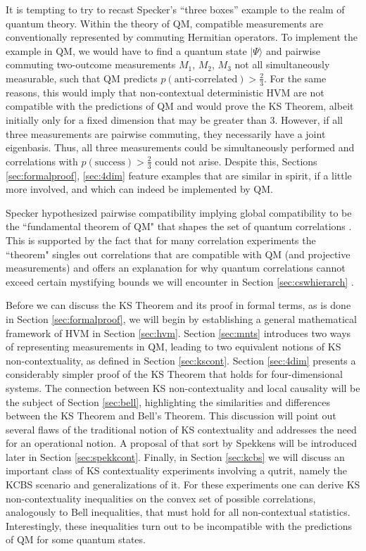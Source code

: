 It is tempting to try to recast Specker's “three boxes” example to the realm of quantum theory. Within the theory of QM, compatible measurements are conventionally represented by commuting Hermitian operators. To implement the example in QM, we would have to find a quantum state $|\Psi\rangle$ and pairwise commuting two-outcome measurements $M_{1}$, $M_{2}$, $M_{3}$ not all simultaneously measurable, such that QM predicts $p(\text{anti-correlated})>\frac{2}{3}$. For the same reasons, this would imply that non-contextual deterministic HVM are not compatible with the predictions of QM and would prove the KS Theorem, albeit initially only for a fixed dimension that may be greater than 3. However, if all three measurements are pairwise commuting, they necessarily have a joint eigenbasis. Thus, all three measurements could be simultaneously performed and correlations with $p(\text{success})>\frac{2}{3}$ could not arise. Despite this, Sections \ref{sec:formalproof}, \ref{sec:4dim} feature examples that are similar in spirit, if a little more involved, and which can indeed be implemented by QM.

Specker hypothesized pairwise compatibility implying global compatibility to be the ``fundamental theorem of QM" that shapes the set of quantum correlations \cite{Cabello2012}. This is supported by the fact that for many correlation experiments the ``theorem" singles out correlations that are compatible with QM (and projective measurements) and offers an explanation for why quantum correlations cannot exceed certain mystifying bounds we will encounter in Section \ref{sec:cswhierarch} \cite{Cabello2013}.

Before we can discuss the KS Theorem and its proof in formal terms, as is done in Section \ref{sec:formalproof}, we will begin by establishing a general mathematical framework of HVM in Section \ref{sec:hvm}. Section \ref{sec:mnts} introduces two ways of representing measurements in QM, leading to two equivalent notions of KS non-contextuality, as defined in Section \ref{sec:kscont}. Section \ref{sec:4dim} presents a considerably simpler proof of the KS Theorem that holds for four-dimensional systems. The connection between KS non-contextuality and local causality will be the subject of Section \ref{sec:bell}, highlighting the similarities and differences between the KS Theorem and Bell's Theorem. This discussion will point out several flaws of the traditional notion of KS contextuality and addresses the need for an operational notion. A proposal of that sort by Spekkens will be introduced later in Section \ref{sec:spekkcont}. Finally, in Section \ref{sec:kcbs} we will discuss an important class of KS contextuality experiments involving a qutrit, namely the KCBS scenario and generalizations of it. For these experiments one can derive KS non-contextuality inequalities on the convex set of possible correlations, analogously to Bell inequalities, that must hold for all non-contextual statistics. Interestingly, these inequalities turn out to be incompatible with the predictions of QM for some quantum states.

